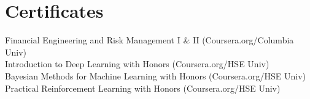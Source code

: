 \documentclass[11pt]{../yhlcv}
\begin{document}
\section*{Certificates}

Financial Engineering and Risk Management I \& II (Coursera.org/Columbia Univ)  \\
Introduction to Deep Learning with Honors (Coursera.org/HSE Univ) \\
Bayesian Methods for Machine Learning with Honors (Coursera.org/HSE Univ)   \\
Practical Reinforcement Learning with Honors (Coursera.org/HSE Univ)  \\
\end{document}
